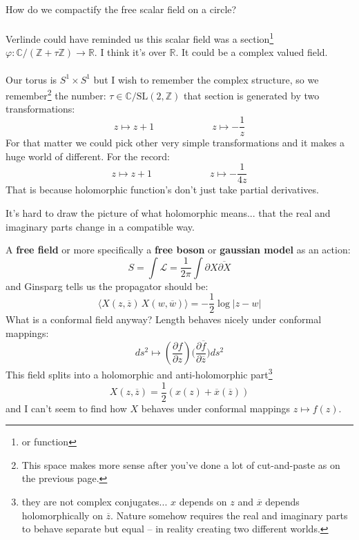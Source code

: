 \documentclass[12pt]{article}
\begin{document}
\noindent How do we compactify the free scalar field on a circle?  \\ \\
Verlinde could have reminded us this scalar field was a section\footnote{or function} $\varphi: \mathbb{C}/(\mathbb{Z} + \tau \mathbb{Z}) \to \mathbb{R}$.  I think it's over $\mathbb{R}$.  It could be a complex valued field. \\ \\
Our torus is $S^1 \times S^1$ but I wish to remember the complex structure, so we remember\footnote{This space makes more sense after you've done a lot of cut-and-paste as on the previous page.} the number: $\tau \in \mathbb{C} / \text{SL}(2, \mathbb{Z})$  that section is generated by two transformations:
$$z \mapsto z + 1 \hspace{1in} z \mapsto - \frac{1}{z} $$
For that matter we could pick other very simple transformations and it makes a huge world of different.  For the record:
$$z \mapsto z + 1 \hspace{1in} z \mapsto - \frac{1}{4z} $$
That is because holomorphic function's don't just take partial derivatives.

\newpage

\noindent 

It's hard to draw the picture of what holomorphic means... that the real and imaginary parts change in a compatible way.

\newpage

\noindent A \textbf{free field} or more specifically a \textbf{free boson} or \textbf{gaussian model} as an action:
$$ S = \int \mathcal{L} = \frac{1}{2\pi} \int \partial X \overline{\partial X} $$
and Ginsparg tells us the propagator should be:
$$ \langle X(z, \overline{z})\, X(w, \overline{w} )\rangle = - \frac{1}{2} \log |z - w| $$
What is a conformal field anyway?  Length behaves nicely under conformal mappings:
$$ ds^2 \mapsto \left( \frac{\partial f}{\partial z} \right)
\bigg( \frac{\partial \overline{f}}{\partial \overline{z}} \bigg) ds^2 $$
This field splits into a holomorphic and anti-holomorphic part\footnote{they are not complex conjugates... $x$ depends on $z$ and $\overline{x}$ depends holomorphically on $\overline{z}$.  Nature somehow requires the real and imaginary parts to behave separate but equal -- in reality creating two different worlds.}
$$ X(z, \overline{z}) = \frac{1}{2}( x(z) + \overline{x}(\overline{z}) ) $$
and I can't seem to find how $X$ behaves under conformal mappings $z \mapsto f(z)$.
\end{document}
